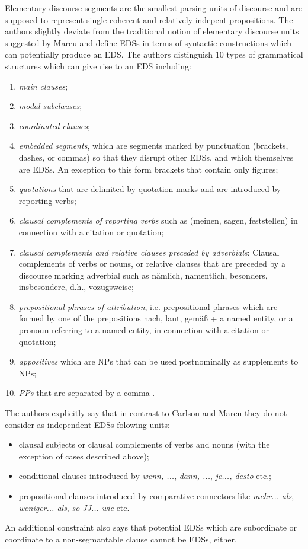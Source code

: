 \documentclass[a4paper,11pt]{article}
\begin{document}
Elementary discourse segments are the smallest parsing units of
discourse and are supposed to represent single coherent and relatively
indepent propositions.  The authors slightly deviate from the
traditional notion of elementary discourse units suggested by Marcu
\cite{Marcu-99} and define EDSs in terms of syntactic constructions
which can potentially produce an EDS.  The authors distinguish 10
types of grammatical structures which can give rise to an EDS
including:
\begin{enumerate}
  \item \textit{main clauses};
  \item \textit{modal subclauses};
  \item \textit{coordinated clauses};
  \item \textit{embedded segments}, which are segments marked by punctuation
    (brackets, dashes, or commas) so that they disrupt other EDSs, and which
    themselves are EDSs. An exception to this form brackets that contain only
    figures;
  \item \textit{quotations} that are delimited by quotation marks and are
    introduced by reporting verbs;
  \item \textit{clausal complements of reporting verbs} such as (meinen,
    sagen, feststellen) in connection with a citation or quotation;
  \item \textit{clausal complements and relative clauses preceded by
    adverbials}: Clausal complements of verbs or nouns, or relative clauses
    that are preceded by a discourse marking adverbial such as n\"amlich,
    namentlich, besonders, insbesondere, d.h., vozugsweise;
  \item \textit{prepositional phrases of attribution}, i.e. prepositional
    phrases which are formed by one of the prepositions nach, laut, gem\"a\ss
    + a named entity, or a pronoun referring to a named entity, in connection
    with a citation or quotation;
  \item \textit{appositives} which are NPs that can be used postnominally as
    supplements to NPs;
  \item \textit{PPs} that are separated by a comma .
\end{enumerate}

The authors explicitly say that in contrast to Carlson and Marcu
\cite{Carlson-Marcu-01} they do not consider as independent EDSs folowing
units:
\begin{itemize}
  \item clausal subjects or clausal complements of verbs and nouns (with the
    exception of cases described above);
  \item conditional clauses introduced by \textit{wenn, ...}, \textit{dann,
    ...}, \textit{je..., desto} etc.;
  \item propositional clauses introduced by comparative connectors like
    \textit{mehr... als}, \textit{weniger... als}, \textit{so JJ... wie} etc.
\end{itemize}
An additional constraint also says that potential EDSs which are subordinate
or coordinate to a non-segmantable clause cannot be EDSs, either.
\end{document}
